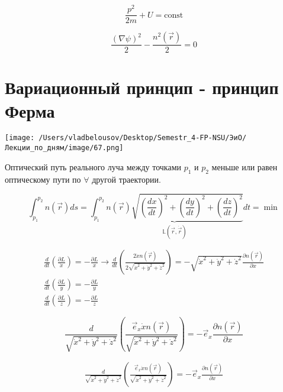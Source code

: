 \documentclass[12pt, a4paper]{report}
\begin{document}
\[ \frac{ p ^2 }{ 2 m } + U = \mathrm{const}    \]

\[ \frac{(\nabla \psi ) ^2 }{2 } -\frac{ n ^2 (\vec{r } )}{2 } =0   \] 

\section{Вариационный принцип - принцип Ферма} 

\begin{center}
    \texttt{[image: /Users/vladbelousov/Desktop/Semestr\_4-FP-NSU/ЭиО/Лекции\_по\_дням/image/67.png]}
\end{center}

Оптический путь реального луча между точками \( p_1  \) и \( p_2  \) меньше или равен оптическому пути по \( \forall     \) другой траектории.

\[ \int_{ p_1 }^{p_2 } n (\vec{r } )d s = \int_{ p_1 }^{ p_2} \underbrace{ n (\vec{r } ) \sqrt{ \left( \frac{dx}{dt }     \right) ^2 + \left( \frac{dy}{dt }     \right) ^2  +\left( \frac{dz}{dt }     \right) ^2  }}_{\mathbb{L}(\vec{r }  ,\dot{ \vec{r}}  )} dt = \min  \] 

\[ \begin{aligned}
    \frac{d }{dt } \left(  \frac{\partial  L }{\dot{x } }  \right) =  - \frac{\partial  L }{x}  \to \frac{d}{dt } \left(  \frac{ 2 \dot{ x }  n (\vec{r } )}{ 2 \sqrt{\dot{ x } ^2 + \dot{ y } ^2 + \dot{ z } ^2 } }   \right) = -\sqrt{\dot{ x } ^2 + \dot{ y } ^2 + \dot{ z } ^2}  \frac{\partial  n ( \vec{r } )}{\partial  x} \\ 
    \frac{d }{dt } \left(  \frac{\partial  L }{\dot{y } }  \right) =  - \frac{\partial  L }{y} \\
    \frac{d }{dt } \left(  \frac{\partial  L }{\dot{z } }  \right) =  - \frac{\partial  L }{z} 
\end{aligned} \] 

\[     \frac{d}{\sqrt{\dot{ x } ^2 + \dot{ y } ^2 + \dot{ z } ^2 }} \left(  \frac{\vec{e } _x \dot{ x }  n(\vec{r } )}{\sqrt{\dot{ x } ^2 + \dot{ y } ^2 + \dot{ z } ^2 }}  \right) = - \vec{e } _x \frac{ \partial  n (\vec{r } )}{\partial  x } 
\] 

\[ \begin{array}{l|}
    \frac{d}{\sqrt{\dot{ x } ^2 + \dot{ y } ^2 + \dot{ z } ^2 }} \left(  \frac{\vec{e } _x \dot{ x }  n(\vec{r } )}{\sqrt{\dot{ x } ^2 + \dot{ y } ^2 + \dot{ z } ^2 }}  \right) = - \vec{e } _x \frac{ \partial  n (\vec{r } )}{\partial  x } \\
\end{array}   \] 
\end{document}
